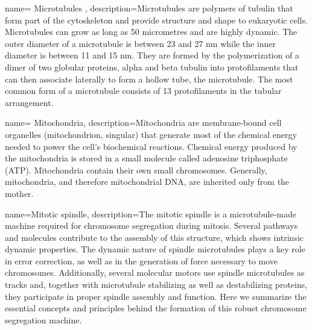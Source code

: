 
 {
	name= {Microtubules} ,
	description={Microtubules are polymers of tubulin that form part of the cytoskeleton and provide structure and shape to eukaryotic cells. Microtubules can grow as long as 50 micrometres and are highly dynamic. The outer diameter of a microtubule is between 23 and 27 nm while the inner diameter is between 11 and 15 nm. They are formed by the polymerization of a dimer of two globular proteins, alpha and beta tubulin into protofilaments that can then associate laterally to form a hollow tube, the microtubule. The most common form of a microtubule consists of 13 protofilaments in the tubular arrangement.}}


 {
	name= {Mitochondria},
	description={Mitochondria are membrane-bound cell organelles (mitochondrion, singular) that generate most of the chemical energy needed to power the cell's biochemical reactions. Chemical energy produced by the mitochondria is stored in a small molecule called adenosine triphosphate (ATP). Mitochondria contain their own small chromosomes. Generally, mitochondria, and therefore mitochondrial DNA, are inherited only from the mother. }}


 {
	name={Mitotic spindle},
	description={The mitotic spindle is a microtubule-made machine required for chromosome segregation during mitosis. Several pathways and molecules contribute to the assembly of this structure, which shows intrinsic dynamic properties. The dynamic nature of spindle microtubules plays a key role in error correction, as well as in the generation of force necessary to move chromosomes. Additionally, several molecular motors use spindle microtubules as tracks and, together with microtubule stabilizing as well as destabilizing proteins, they participate in proper spindle assembly and function. Here we summarize the essential concepts and principles behind the formation of this robust chromosome segregation machine.}}

